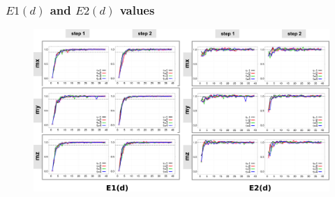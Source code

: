 \documentclass{beamer}
\begin{document}
\begin{frame}
\frametitle{$E1(d)$ and $E2(d)$ values}
\vspace{-0.6cm}
\begin{figure}
\includegraphics[scale=0.07]{ev_mag} \\

\end{figure}  
\end{frame}
\end{document}
